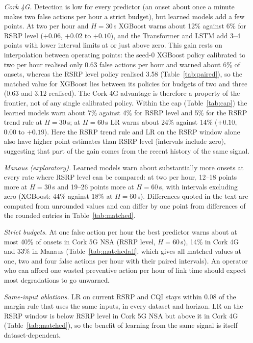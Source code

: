 \documentclass[preprint,review,12pt]{elsarticle}
\begin{document}
\emph{Cork 4G.} Detection is low for every predictor (an onset about once a minute
makes two false actions per hour a strict budget), but learned models add a few
points. At two per hour and $H=30$\,s XGBoost warns about 12\% against 6\% for RSRP
level ($+0.06$, $+0.02$ to $+0.10$), and the Transformer and LSTM add 3--4 points with
lower interval limits at or just above zero. This gain rests on interpolation between
operating points: the seed-0 XGBoost policy calibrated to two per hour realised only
0.63 false actions per hour and warned about 6\% of onsets, whereas the RSRP level
policy realised 3.58 (Table~\ref{tab:paired}), so the matched value for XGBoost lies
between its policies for budgets of two and three (0.63 and 3.12 realised). The Cork 4G
advantage is therefore a property of the frontier, not of any single calibrated policy.
Within the cap (Table~\ref{tab:cap}) the learned models warn about 7\% against 4\% for
RSRP level and 5\% for the RSRP trend rule at $H=30$\,s; at $H=60$\,s LR warns about 24\% against 14\% ($+0.10$,
$0.00$ to $+0.19$). Here the RSRP trend rule and LR on the RSRP window alone also have
higher point estimates than RSRP level (intervals include zero), suggesting that part
of the gain comes from the recent history of the same signal.

\emph{Manaus (exploratory).} Learned models warn about substantially more onsets at
every rate where RSRP level can be compared: at two per hour, 12--18 points more at $H=30$\,s and 19--26 points
more at $H=60$\,s, with intervals excluding zero (XGBoost: 44\% against 18\% at
$H=60$\,s). Differences quoted in the text are computed from unrounded values and can
differ by one point from differences of the rounded entries in Table~\ref{tab:matched}.

\emph{Strict budgets.} At one false action per hour the best predictor warns about at
most 40\% of onsets in Cork 5G NSA (RSRP level, $H=60$\,s), 14\% in Cork 4G and 33\% in
Manaus (Table~\ref{tab:matchedall}, which gives all matched values at one, two and four
false actions per hour with their paired intervals). An operator who can afford one
wasted preventive action per hour of link time
should expect most degradations to go unwarned.

\emph{Same-input ablations.} LR on current RSRP and CQI stays within 0.08 of the margin
rule that uses the same inputs, in every dataset and horizon. LR on the RSRP window
is below RSRP level in Cork 5G NSA but above it in Cork 4G (Table~\ref{tab:matched}), so
the benefit of learning from the same signal is itself dataset-dependent.
\end{document}
